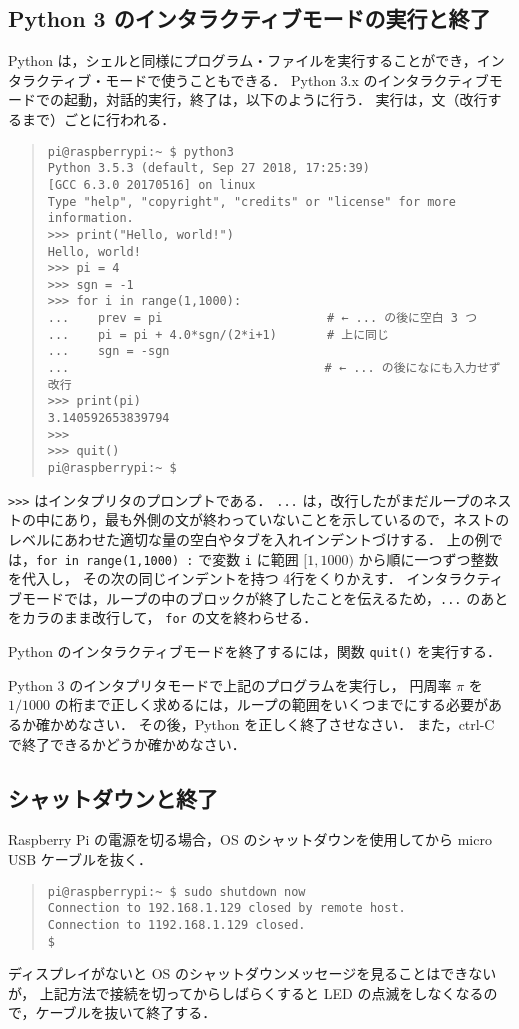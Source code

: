 \documentclass[11pt,a4,epsf]{report}
\begin{document}
\subsection{Python 3 のインタラクティブモードの実行と終了}

Python は，シェルと同様にプログラム・ファイルを実行することができ，インタラクティブ・モードで使うこともできる．
Python 3.x のインタラクティブモードでの起動，対話的実行，終了は，以下のように行う．
実行は，文（改行するまで）ごとに行われる．
\begin{quote}
\small
\begin{verbatim}
pi@raspberrypi:~ $ python3
Python 3.5.3 (default, Sep 27 2018, 17:25:39) 
[GCC 6.3.0 20170516] on linux
Type "help", "copyright", "credits" or "license" for more information.
>>> print("Hello, world!")
Hello, world!
>>> pi = 4
>>> sgn = -1
>>> for i in range(1,1000):
...    prev = pi                       # ← ... の後に空白 3 つ
...    pi = pi + 4.0*sgn/(2*i+1)       # 上に同じ
...    sgn = -sgn
... 　                                 # ← ... の後になにも入力せず改行
>>> print(pi)
3.140592653839794
>>> 
>>> quit()
pi@raspberrypi:~ $ 
\end{verbatim}
\end{quote}
\verb+>>>+ はインタプリタのプロンプトである．
\verb+...+ は，改行したがまだループのネストの中にあり，最も外側の文が終わっていないことを示しているので，ネストのレベルにあわせた適切な量の空白やタブを入れインデントづけする．
上の例では，\verb+for in range(1,1000) :+ で変数 \verb+i+ に範囲 $[1,1000)$ から順に一つずつ整数を代入し，
その次の同じインデントを持つ 4行をくりかえす．
インタラクティブモードでは，ループの中のブロックが終了したことを伝えるため，\verb+...+ のあとをカラのまま改行して， \verb+for+ の文を終わらせる．

Python のインタラクティブモードを終了するには，関数 \verb+quit()+ を実行する．

\begin{excercise}
Python 3 のインタプリタモードで上記のプログラムを実行し， 
円周率 $\pi$ を $1/1000$ の桁まで正しく求めるには，ループの範囲をいくつまでにする必要があるか確かめなさい．
その後，Python を正しく終了させなさい．
また，ctrl-C で終了できるかどうか確かめなさい．
\end{excercise}

\subsection{シャットダウンと終了}

Raspberry Pi の電源を切る場合，OS のシャットダウンを使用してから micro USB ケーブルを抜く．
\begin{quote}
\small
\begin{verbatim}
pi@raspberrypi:~ $ sudo shutdown now
Connection to 192.168.1.129 closed by remote host.
Connection to 1192.168.1.129 closed.
$ 
\end{verbatim}
\end{quote}
ディスプレイがないと OS のシャットダウンメッセージを見ることはできないが，
上記方法で接続を切ってからしばらくすると LED の点滅をしなくなるので，ケーブルを抜いて終了する．
\end{document}
